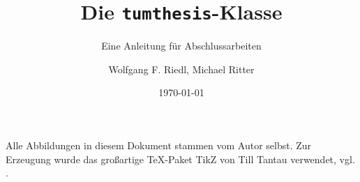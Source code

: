 \documentclass[]{tumthesis}
\author{Wolfgang F. Riedl, Michael Ritter}
\title{Die \texttt{tumthesis}-Klasse}
\subtitle{Eine Anleitung für Abschlussarbeiten}
\institute{Lehrstuhl für Angewandte Geometrie und Diskrete Mathematik}
\date{\today} %
\begin{document}
\pagestyle{empty}
\frontmatter%
\maketitlepage%
\makedeclaration%


\tableofcontents%

\mainmatter%
\pagestyle{headings}





\appendix

\backmatter


\listoffigures

\vspace*{1.5cm}

Alle Abbildungen in diesem Dokument stammen vom Autor selbst. Zur Erzeugung
wurde das großartige \TeX-Paket TikZ von Till Tantau verwendet, vgl.
\cite{Tantau2007}.

\listoftables


\printindex

\printbibliography[heading=bibintoc]

\listoffixmes
%
\end{document}
